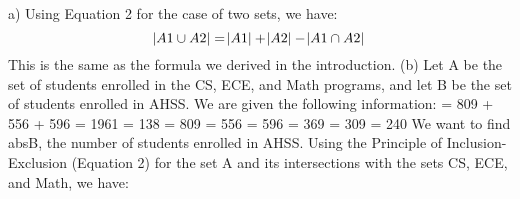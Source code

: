 \documentclass[a4paper]{exam}
\begin{document}
\begin{questions}

  \begin{solution}
    a) Using Equation 2 for the case of two sets, we have:
    \newline
    \begin{equation}
        \abs{A1 \cup A2} = \abs{A1} + \abs{A2} - \abs{A1 \cap A2}
    \end{equation}
    \newline
    This is the same as the formula we derived in the introduction.
    \newline
    \newline
    (b) Let A be the set of students enrolled in the CS, ECE, and Math programs, and let B be the set of students enrolled in AHSS. We are given the following information:
    \newline
     = 809 + 556 + 596 = 1961
    \newline
     = 138
    \newline
     = 809
    \newline
     = 556
    \newline
     = 596
    \newline
     = 369
    \newline
     = 309
    \newline
     = 240
    \newline
    We want to find abs{B}, the number of students enrolled in AHSS. Using the Principle of Inclusion-Exclusion (Equation 2) for the set A and its intersections with the sets CS, ECE, and Math, we have:
    \newline
    

\end{solution}
\end{questions}
\end{document}
